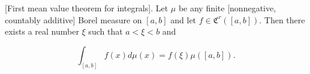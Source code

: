 [First mean value theorem for integrals]. Let $\mu$ be any finite [nonnegative, countably additive] Borel measure on $[a,b]$ and let $f \in \mathfrak{C}^r([a,b])$. Then there exists a real number $\xi$ such that $a < \xi < b$ and

$$\int_{[a,b]} f(x) d\mu(x) = f(\xi) \mu([a,b]).$$